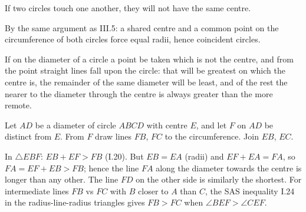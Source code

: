 \documentclass{rrxiv}
\begin{document}
\begin{claim}
\label{prop:III.6}
If two circles touch one another, they will not have the same centre.
\end{claim}
\begin{evidence}
\label{ev:III.6}
By the same argument as III.5: a shared centre and a common point on
the circumference of both circles force equal radii, hence coincident
circles.
\end{evidence}

\begin{claim}
\label{prop:III.7}
If on the diameter of a circle a point be taken which is not the
centre, and from the point straight lines fall upon the circle: that
will be greatest on which the centre is, the remainder of the same
diameter will be least, and of the rest the nearer to the diameter
through the centre is always greater than the more remote.
\end{claim}
\begin{evidence}
\label{ev:III.7}
Let $AD$ be a diameter of circle $ABCD$ with centre $E$, and let
$F$ on $AD$ be distinct from $E$.  From $F$ draw lines $FB$, $FC$
to the circumference.  Join $EB$, $EC$.

In $\triangle EBF$: $EB + EF > FB$ (I.20).  But $EB = EA$ (radii)
and $EF + EA = FA$, so $FA = EF + EB > FB$; hence the line $FA$
along the diameter towards the centre is longer than any other.
The line $FD$ on the other side is similarly the shortest.  For
intermediate lines $FB$ vs $FC$ with $B$ closer to $A$ than $C$,
the SAS inequality I.24 in the radius-line-radius triangles gives
$FB > FC$ when $\angle BEF > \angle CEF$.
\end{evidence}
\end{document}
